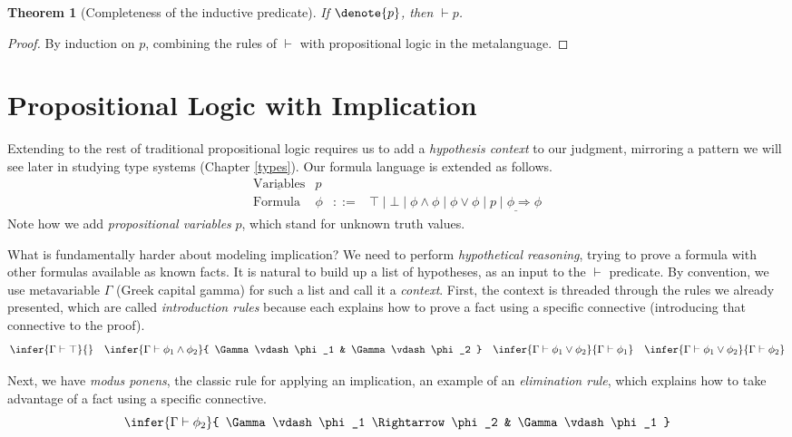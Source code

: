 \documentclass{amsbook}
\newtheorem{theorem}{Theorem}[chapter]
\theoremstyle{definition}
\theoremstyle{remark}
\numberwithin{section}{chapter}
\numberwithin{equation}{chapter}
\begin{document}
\begin{theorem}[Completeness of the inductive predicate]
  If $\denote{p}$, then $\vdash p$.
\end{theorem}
\begin{proof}
  By induction on $p$, combining the rules of $\vdash$ with propositional logic in the metalanguage.
\end{proof}

\section{Propositional Logic with Implication}

Extending to the rest of traditional propositional logic requires us to add a \emph{hypothesis context} to our judgment, mirroring a pattern we will see later in studying type systems (Chapter \ref{types}).
Our formula language is extended as follows.
$$\begin{array}{rrcl}
  \underline{\textrm{Variables}} & p \\
  \textrm{Formula} & \phi &::=& \top \mid \bot \mid \phi \land \phi \mid \phi \lor \phi \mid \underline{p \mid \phi \Rightarrow \phi}
\end{array}$$
Note how we add \emph{propositional variables} $p$, which stand for unknown truth values.

What is fundamentally harder about modeling implication?
We need to perform \emph{hypothetical reasoning}, trying to prove a formula with other formulas available as known facts.
It is natural to build up a list of hypotheses, as an input to the $\vdash$ predicate.
By convention, we use metavariable $\Gamma$ (Greek capital gamma) for such a list and call it a \emph{context}.
First, the context is threaded through the rules we already presented, which are called \emph{introduction rules} because each explains how to prove a fact using a specific connective (introducing that connective to the proof).
$$\infer{\Gamma \vdash \top}{}
\quad \infer{\Gamma \vdash \phi_1 \land \phi_2}{
  \Gamma \vdash \phi_1
  & \Gamma \vdash \phi_2
}
\quad \infer{\Gamma \vdash \phi_1 \lor \phi_2}{
  \Gamma \vdash \phi_1
}
\quad \infer{\Gamma \vdash \phi_1 \lor \phi_2}{
  \Gamma \vdash \phi_2
}$$

Next, we have \emph{modus ponens}, the classic rule for applying an implication, an example of an \emph{elimination rule}, which explains how to take advantage of a fact using a specific connective.
$$\infer{\Gamma \vdash \phi_2}{
  \Gamma \vdash \phi_1 \Rightarrow \phi_2
  & \Gamma \vdash \phi_1
}$$
\end{document}
